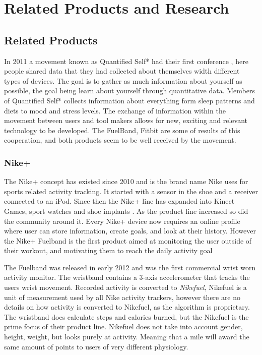 \chapter{Related Products and Research} %

\label{Chapter3} %


\section{Related Products}
In 2011 a movement known as Quantified Self*\cite{quantfiedSelf} had their first conference \cite{bodyHackers}, here people shared data that they had collected about themselves width different types of devices. The goal is to gather as much information about yourself as possible, the goal being learn about yourself through quantitative data. Members of Quantified Self* collects information about everything form sleep patterns and diets to mood and stress levels.
The exchange of information within the movement between users and tool makers allows for new, exciting and relevant technology to be developed. The FuelBand\cite{fuelBand}, Fitbit\cite{fitBit} are some of results of this cooperation, and both products seem to be well received by the movement. %

\subsection{Nike+}
The Nike+ concept has existed since 2010 and is the brand name Nike uses for sports related activity tracking. It started with a sensor in the shoe and a receiver connected to an iPod. Since then the Nike+ line has expanded into Kinect Games, sport watches and shoe implants \cite{nikeProducts}. As the product line increased so did the community around it. Every Nike+ device now requires an online profile where user can store information, create goals, and look at their history. However the Nike+ Fuelband \cite{fuelBand} is the first product aimed at monitoring the user outside of their workout, and motivating them to reach the daily activity goal

The Fuelband\cite{fuelBand} was released in early 2012 and was the first commercial wrist worn activity monitor. The wristband contains a 3-axis accelerometer that tracks the users wrist movement. Recorded activity is converted to \emph{Nikefuel}, Nikefuel\cite{nikefuel} is a unit of measurement used by all Nike activity trackers, however there are no details on how activity is converted to Nikefuel, as the algorithm is proprietary. The wristband does calculate steps and calories burned, but the Nikefuel is the prime focus of their product line. Nikefuel does not take into account gender, height, weight, but looks purely at activity. Meaning that a mile will award the same amount of points to users of very different physiology.

